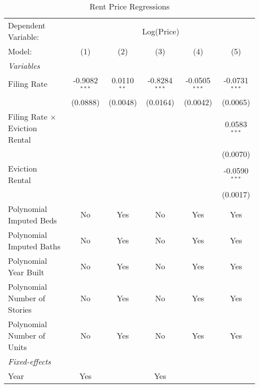 \begin{table}[htbp]
   \caption{\label{tab:rent_regs} Rent Price Regressions}
   \centering
   \begin{tabular}{lccccc}
      \tabularnewline \midrule \midrule
      Dependent Variable: & \multicolumn{5}{c}{Log(Price)}\\
      Model:                                & (1)             & (2)           & (3)             & (4)             & (5)\\  
      \midrule
      \emph{Variables}\\
      Filing Rate                           & -0.9082$^{***}$ & 0.0110$^{**}$ & -0.8284$^{***}$ & -0.0505$^{***}$ & -0.0731$^{***}$\\   
                                            & (0.0888)        & (0.0048)      & (0.0164)        & (0.0042)        & (0.0065)\\   
      Filing Rate $\times$ Eviction Rental  &                 &               &                 &                 & 0.0583$^{***}$\\   
                                            &                 &               &                 &                 & (0.0070)\\   
      Eviction Rental                       &                 &               &                 &                 & -0.0590$^{***}$\\   
                                            &                 &               &                 &                 & (0.0017)\\   
      Polynomial Imputed Beds               & No              & Yes           & No              & Yes             & Yes\\  
      Polynomial Imputed Baths              & No              & Yes           & No              & Yes             & Yes\\  
      Polynomial Year Built                 & No              & Yes           & No              & Yes             & Yes\\  
      Polynomial Number of Stories          & No              & Yes           & No              & Yes             & Yes\\  
      Polynomial Number of Units            & No              & Yes           & No              & Yes             & Yes\\  
      \midrule
      \emph{Fixed-effects}\\
      Year                                  & Yes             &               & Yes             &                 & \\  

\end{tabular}
\end{table}
